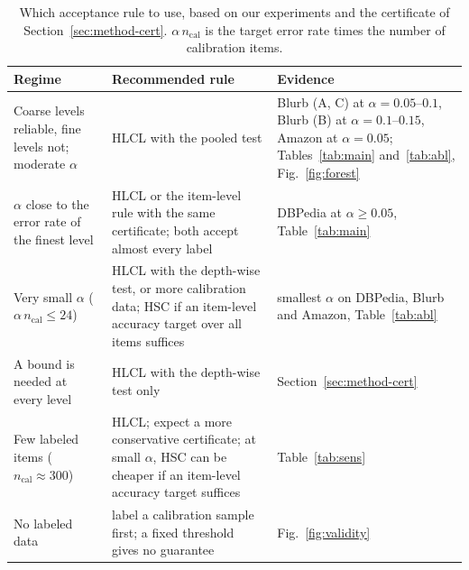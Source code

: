 \documentclass[preprint,12pt]{elsarticle}
\theoremstyle{definition}
\newcommand{\hlcl}{\textup{\textsc{HLCL}}}
\begin{document}
\begin{table}[!tbp]
\centering
\footnotesize
\setlength{\tabcolsep}{3pt}
\caption{Which acceptance rule to use, based on our experiments and the certificate of Section~\ref{sec:method-cert}.
$\alpha\,n_{\mathrm{cal}}$ is the target error rate times the number of
calibration items.}
\label{tab:guide}
\begin{tabularx}{\textwidth}{>{\raggedright\arraybackslash}p{4.2cm} >{\raggedright\arraybackslash}X >{\raggedright\arraybackslash}p{3.3cm}}
\toprule
Regime & Recommended rule & Evidence \\
\midrule
Coarse levels reliable, fine levels not; moderate $\alpha$ & \hlcl{} with the pooled test & Blurb (A, C) at $\alpha=0.05$--$0.1$, Blurb (B) at $\alpha=0.1$--$0.15$, Amazon at $\alpha=0.05$; Tables~\ref{tab:main} and~\ref{tab:abl}, Fig.~\ref{fig:forest} \\ \addlinespace[2pt]
$\alpha$ close to the error rate of the finest level & \hlcl{} or the item-level rule with the same certificate; both accept almost every label & DBPedia at $\alpha\ge0.05$, Table~\ref{tab:main} \\ \addlinespace[2pt]
Very small $\alpha$ ($\alpha\,n_{\mathrm{cal}}\le24$) & \hlcl{} with the depth-wise test, or more calibration data; HSC if an item-level accuracy target over all items suffices & smallest $\alpha$ on DBPedia, Blurb and Amazon, Table~\ref{tab:abl} \\ \addlinespace[2pt]
A bound is needed at every level & \hlcl{} with the depth-wise test only & Section~\ref{sec:method-cert} \\ \addlinespace[2pt]
Few labeled items ($n_{\mathrm{cal}}\approx300$) & \hlcl{}; expect a more conservative certificate; at small $\alpha$, HSC can be cheaper if an item-level accuracy target suffices & Table~\ref{tab:sens} \\ \addlinespace[2pt]
No labeled data & label a calibration sample first; a fixed threshold gives no guarantee & Fig.~\ref{fig:validity} \\
\bottomrule
\end{tabularx}
\end{table}
\end{document}
